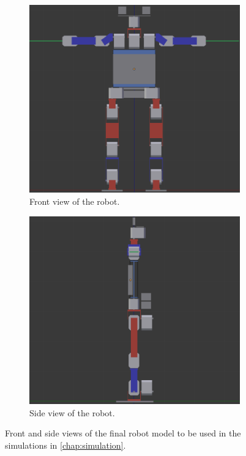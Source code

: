 \begin{figure}[htp]
\centering
\begin{subfigure}[b]{0.64\textwidth}
    \includegraphics[width = \textwidth]{figures/robot_v7_front}
    \caption[]{Front view of the robot.}
    \label{fig:robotv7_front}
\end{subfigure}

\begin{subfigure}[b]{0.64\textwidth}
\centering
    \includegraphics[width = \textwidth]{figures/robot_v7_side}
    \caption[]{Side view of the robot.}
    \label{fig:robotv7_side}
\end{subfigure}
\caption[Final robot model]{Front and side views of the final robot model to be used in the simulations in \cref{chap:simulation}.}
\label{fig:robotv7}
\end{figure}